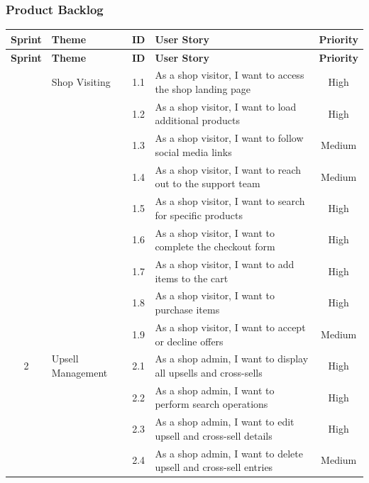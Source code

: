 \subsubsection{Product Backlog}

\begin{longtable}{|c|p{6cm}|c|p{6cm}|c|}
\hline
\textbf{Sprint} & \textbf{Theme} & \textbf{ID} & \textbf{User Story} & \textbf{Priority} \\ 
\hline
\endfirsthead

\hline
\textbf{Sprint} & \textbf{Theme} & \textbf{ID} & \textbf{User Story} & \textbf{Priority} \\ 
\hline
\endhead

\hline
\endfoot

\hline
\endlastfoot

\multirow{1}{*}{1} & \multirow{1}{*}{Shop Visiting} & 1.1 & As a shop visitor, I want to access the shop landing page & High \\ \cline{3-5}
& & 1.2 & As a shop visitor, I want to load additional products & High \\ \cline{3-5}
& & 1.3 & As a shop visitor, I want to follow social media links & Medium \\ \cline{3-5}
& & 1.4 & As a shop visitor, I want to reach out to the support team & Medium \\ \cline{3-5}
& & 1.5 & As a shop visitor, I want to search for specific products & High \\ \cline{3-5}
& & 1.6 & As a shop visitor, I want to complete the checkout form & High \\ \cline{3-5}
& & 1.7 & As a shop visitor, I want to add items to the cart & High \\ \cline{3-5}
& & 1.8 & As a shop visitor, I want to purchase items & High \\ \cline{3-5}
& & 1.9 & As a shop visitor, I want to accept or decline offers & Medium \\ \hline
\multirow{1}{*}{2} & \multirow{1}{*}{Upsell Management} & 2.1 & As a shop admin, I want to display all upsells and cross-sells & High \\ \cline{3-5}
& & 2.2 & As a shop admin, I want to perform search operations & High \\ \cline{3-5}
& & 2.3 & As a shop admin, I want to edit upsell and cross-sell details & High \\ \cline{3-5}
& & 2.4 & As a shop admin, I want to delete upsell and cross-sell entries & Medium \\ \cline{3-5}

\end{longtable}
